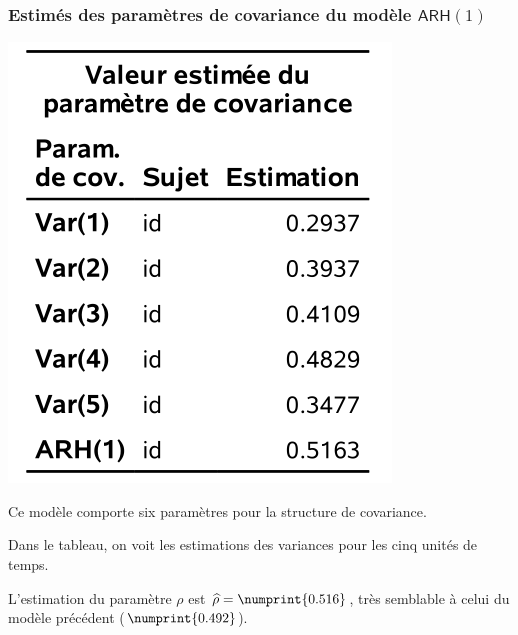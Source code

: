 \documentclass{beamer}
\begin{document}
\begin{frame}[fragile]
\frametitle{Estimés des paramètres de covariance du modèle $\mathsf{ARH}(1)$}
\begin{center}
\includegraphics[width = 0.4\linewidth]{img/c5/diapos6-e19}
\end{center}
\bi
\item Ce modèle comporte six paramètres pour la structure de covariance. 
\item Dans le tableau, on voit les estimations des
variances pour les cinq unités de temps.
\item L'estimation du paramètre $\rho$ est $\hat{\rho} = \numprint{0.516}$, très semblable à celui du modèle précédent ($ \numprint{0.492}$).
\ei 
\end{frame}
% 
% 
% 
% 
\end{document}
